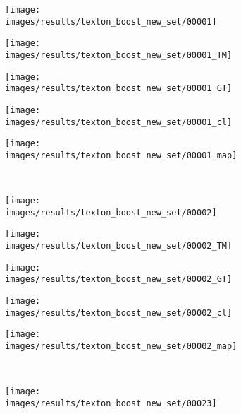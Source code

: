 \begin{figure}[t]
 \centering
 \begin{subfigure}[c]{0.19\textwidth}
  \centering
  \texttt{[image: images/results/texton\_boost\_new\_set/00001]}
 \end{subfigure}
 \begin{subfigure}[c]{0.19\textwidth}
  \centering
  \texttt{[image: images/results/texton\_boost\_new\_set/00001\_TM]}
 \end{subfigure}
 \begin{subfigure}[c]{0.19\textwidth}
  \centering
  \texttt{[image: images/results/texton\_boost\_new\_set/00001\_GT]}
 \end{subfigure}
 \begin{subfigure}[c]{0.19\textwidth}
  \centering
  \texttt{[image: images/results/texton\_boost\_new\_set/00001\_cl]}
 \end{subfigure}
 \begin{subfigure}[c]{0.19\textwidth}
  \centering
  \texttt{[image: images/results/texton\_boost\_new\_set/00001\_map]}
 \end{subfigure}
 \\
 \begin{subfigure}[c]{0.19\textwidth}
  \centering
  \texttt{[image: images/results/texton\_boost\_new\_set/00002]}
 \end{subfigure}
 \begin{subfigure}[c]{0.19\textwidth}
  \centering
  \texttt{[image: images/results/texton\_boost\_new\_set/00002\_TM]}
 \end{subfigure}
 \begin{subfigure}[c]{0.19\textwidth}
  \centering
  \texttt{[image: images/results/texton\_boost\_new\_set/00002\_GT]}
 \end{subfigure}
 \begin{subfigure}[c]{0.19\textwidth}
  \centering
  \texttt{[image: images/results/texton\_boost\_new\_set/00002\_cl]}
 \end{subfigure}
 \begin{subfigure}[c]{0.19\textwidth}
  \centering
  \texttt{[image: images/results/texton\_boost\_new\_set/00002\_map]}
 \end{subfigure}
 \\
 \begin{subfigure}[c]{0.19\textwidth}
  \centering
  \texttt{[image: images/results/texton\_boost\_new\_set/00023]}

\end{subfigure}
\end{figure}
